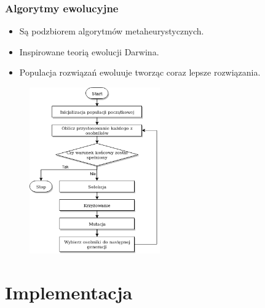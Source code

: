 \documentclass{beamer}
\begin{document}
\begin{frame}
\frametitle{Algorytmy ewolucyjne}
 {
    \begin{itemize}
        \item Są podzbiorem algorytmów metaheurystycznych.
        \item Inspirowane teorią ewolucji Darwina.
        \item Populacja rozwiązań ewoluuje tworząc coraz lepsze rozwiązania.
    \end{itemize}
}
 {
    \begin{figure}[H]
        \centering        
        \includegraphics[width=0.5\textwidth]{alg_gen_szkic.png}
        \label{alg_ewo_img}
    \end{figure}
}
\end{frame}

\section{Implementacja}
\end{document}
